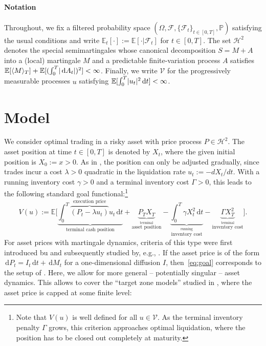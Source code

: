 \documentclass[11pt]{article}
\numberwithin{equation}{section}
\theoremstyle{definition}
\theoremstyle{remark}
\newcommand{\E}{\mathbb{E}} %
\renewcommand{\P}{\mathbb{P}} %
\newcommand{\F}{\mathcal{F}} %
\DeclarePairedDelimiter{\abs}{\lvert}{\rvert} %
\newcommand{\de}{\,\mathrm{d}}
\begin{document}
\paragraph{Notation}

Throughout, we fix a filtered probability space $(\Omega, \F, \{\F_t\}_{t\in[0,T]}, \P)$ satisfying the usual conditions and write $\E_t[\cdot] := \E[\cdot \vert \F_t]$ for $t\in[0,T]$. The set $\mathcal{H}^2$ denotes the special semimartingales whose canonical decomposition $S=M+A$ into a (local) martingale $M$ and a predictable finite-variation process $A$ satisfies $\E[\langle M\rangle_T] + \E[(\int_0^T \abs{\de A_t})^2] < \infty$. Finally, we write $\mathcal{V}$ for the progressively measurable processes $u$ satisfying $\E[\int_0^T \abs{u_t}^2 \de t] < \infty$.


\section{Model}\label{s:model}

We consider optimal trading in a risky asset with price process $P \in \mathcal{H}^2$. The asset position at time $t \in [0,T]$ is denoted by $X_t$, where the given initial position is $X_0:=x>0$. As in \cite{almgren2001optimal}, the position can only be adjusted gradually, since trades incur a cost $\lambda>0$ quadratic in the liquidation rate $u_t := -dX_t/dt$. With a running inventory cost $\gamma>0$ and a terminal inventory cost $\Gamma>0$, this leads to the following standard goal functional:\footnote{Note that $V(u)$ is well defined for all $u\in\mathcal V$. As the terminal inventory penalty $\Gamma$ grows, this criterion approaches optimal liquidation, where the position has to be closed out completely at maturity.}
\begin{equation}\label{eq:goal}
 V(u):= \E\Bigg[\underbrace{\int_0^T \overbrace{(P_t - \lambda u_t)}^{\textrm{execution price}} u_t \de t}_{\textrm{terminal cash position}} + \underbrace{P_T X_T}_{\stackrel{\textrm{terminal}}{\textrm{asset position}}} - \underbrace{\int_0^T \gamma X_t^2 \de t}_{\stackrel{\textrm{running}}{\textrm{inventory cost}}} - \underbrace{\Gamma X_T^2}_{\stackrel{\textrm{terminal}}{\textrm{inventory cost}}} \Bigg].
\end{equation}
For asset prices with martingale dynamics, criteria of this type were first introduced bu \cite{almgren.12,forsyth.al.12} and subsequently studied by, e.g., \cite{schied.13,ankirchner.al.14,graewe.al.15}. If the asset price is of the form $\de P_t = I_t \de t + \de M_t$ for a one-dimensional diffusion $I$, then~\eqref{eq:goal} corresponds to the setup of \cite{lehalle2017incorporating}.  Here, we allow for more general -- potentially singular -- asset dynamics. This allows to cover the ``target zone models'' studied in \cite{neuman.schied.16}, where the asset price is capped at some finite level: 
\end{document}
